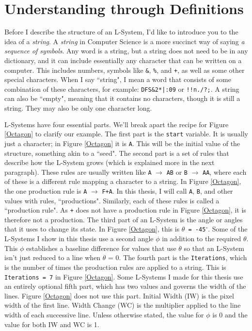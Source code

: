 \documentclass[12pt,twoside]{reedthesis}
\newcommand{\code}[1]{\texttt{#1}}
\begin{document}
\section{Understanding through Definitions}
\label{Understanding-through-Definitions}

	Before I describe the structure of an L-System, I'd like to introduce you to the idea of a \textit{string}. A \textit{string} in Computer Science is a more succinct way of saying \textit{a sequence of symbols}. Any word is a string, but a string does not need to be in any dictionary, and it can include essentially any character that can be written on a computer. This includes numbers, symbols like \code{\&}, \code{\%}, and \code{+}, as well as some other special characters. When I say ``string", I mean a word that consists of some combination of these characters, for example: \code{DFS\&2*|:09} or \code{!!n./?;}. A string can also be ``empty", meaning that it contains no characters, though it is still a string. They may also be only one character long.
	
	L-Systems have four essential parts. We'll break apart the recipe for Figure \ref{Octagon} to clarify our example. The first part is the \code{start} variable. It is usually just a character; in Figure \ref{Octagon} it is \code{A}. This will be the initial value of the structure, something akin to a ``seed". The second part is a set of rules that describe how the L-System grows (which is explained more in the next paragraph). These rules are usually written like \code{A} $\rightarrow$ \code{AB} or \code{B} $\rightarrow$ \code{AA}, where each of these is a different rule mapping a character to a string. In Figure \ref{Octagon}, the one production rule is \code{A} $\rightarrow$ \code{F+A}. In this thesis, I will call \code{A}, \code{B}, and other values with rules, ``productions". Similarly, each of these rules is called a ``production rule". As \code{+} does not have a production rule in Figure \ref{Octagon}, it is therefore not a production. The third part of an L-System is the angle or angles that it uses to change its state. In Figure \ref{Octagon}, this is \code{$\theta$ = -45$^{\circ}$}. Some of the L-Systems I show in this thesis use a second angle \code{$\phi$} in addition to the required \code{$\theta$}. This \code{$\phi$} establishes a baseline difference for values that use \code{$\theta$} so that an L-System isn't just reduced to a line when \code{$\theta$} = 0. The fourth part is the \code{Iterations}, which is the number of times the production rules are applied to a string. This is \code{Iterations = 7} in Figure \ref{Octagon}. Some L-Systems I made for this thesis use an entirely optional fifth part, which has two values and governs the width of the lines. Figure \ref{Octagon} does not use this part. Initial Width (IW) is the pixel width of the first line. Width Change (WC) is the multiplier applied to the line width of each successive line. Unless otherwise stated, the value for \code{$\phi$} is 0 and the value for both IW and WC is 1.
	
\end{document}
